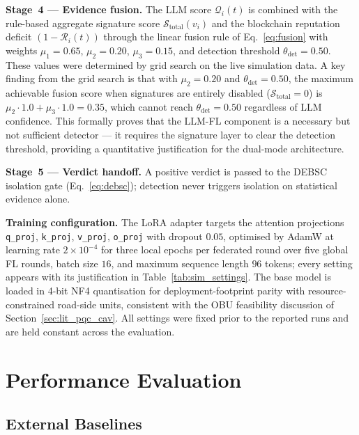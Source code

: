 \documentclass[12pt, a4paper]{report}
\newcommand{\mypar}{\vspace{0.8em}\noindent}
\begin{document}
\mypar
\textbf{Stage~4 --- Evidence fusion.} The LLM score $\mathcal{Q}_i(t)$ is combined
with the rule-based aggregate signature score $\mathcal{S}_{\mathrm{total}}(v_i)$
and the blockchain reputation deficit $(1 - \mathcal{R}_i(t))$ through the
linear fusion rule of Eq.~\eqref{eq:fusion} with weights $\mu_1=0.65$,
$\mu_2=0.20$, $\mu_3=0.15$, and detection threshold $\theta_{\mathrm{det}}=0.50$.
These values were determined by grid search on the live simulation data.
A key finding from the grid search is that with $\mu_2=0.20$ and
$\theta_{\mathrm{det}}=0.50$, the maximum achievable fusion score when
signatures are entirely disabled ($\mathcal{S}_{\mathrm{total}}=0$) is
$\mu_2 \cdot 1.0 + \mu_3 \cdot 1.0 = 0.35$, which cannot reach
$\theta_{\mathrm{det}}=0.50$ regardless of LLM confidence. This formally
proves that the LLM-FL component is a necessary but not sufficient
detector — it requires the signature layer to clear the detection
threshold, providing a quantitative justification for the dual-mode
architecture.

\mypar
\textbf{Stage~5 --- Verdict handoff.} A positive verdict is passed to the DEBSC
isolation gate (Eq.~\eqref{eq:debsc}); detection never triggers isolation on
statistical evidence alone.

\mypar
\textbf{Training configuration.} The LoRA adapter targets the attention
projections \texttt{q\_proj}, \texttt{k\_proj}, \texttt{v\_proj},
\texttt{o\_proj} with dropout $0.05$, optimised by AdamW at learning rate
$2\times10^{-4}$ for three local epochs per federated round over
five global FL rounds, batch size $16$, and
maximum sequence length $96$ tokens; every setting appears with its justification
in Table~\ref{tab:sim_settings}. The base model is loaded in 4-bit NF4
quantisation for deployment-footprint parity with resource-constrained road-side
units, consistent with the OBU feasibility discussion of
Section~\ref{sec:lit_pqc_cav}. All settings were fixed prior to the reported runs
and are held constant across the evaluation.

\section{Performance Evaluation}
\label{sec:evaluation}

\subsection{External Baselines}
\end{document}
